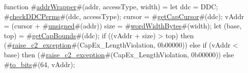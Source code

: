 function #\hyperref[sailMIPSzaddrWrapper]{addrWrapper}#(addr, accessType, width) =
  {
    let ddc = DDC;
    #\hyperref[sailMIPSzcheckDDCPerms]{checkDDCPerms}#(ddc, accessType);
    cursor = #\hyperref[sailMIPSzgetCapCursor]{getCapCursor}#(ddc);
    vAddr  = (cursor + #\hyperref[sailMIPSzunsigned]{unsigned}#(addr)) %
    size   = #\hyperref[sailMIPSzwordWidthBytes]{wordWidthBytes}#(width);
    let (base, top) = #\hyperref[sailMIPSzgetCapBounds]{getCapBounds}#(ddc);
    if ((vAddr + size) > top) then
      (#\hyperref[sailMIPSzraisezyc2zyexception]{raise\_c2\_exception}#(CapEx_LengthViolation, 0b00000))
    else if (vAddr < base) then
      (#\hyperref[sailMIPSzraisezyc2zyexception]{raise\_c2\_exception}#(CapEx_LengthViolation, 0b00000))
    else
      #\hyperref[sailMIPSztozybits]{to\_bits}#(64, vAddr);
  }

